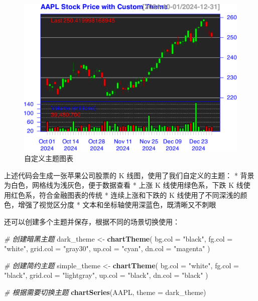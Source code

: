 \documentclass[]{ctexbook}
\newenvironment{Shaded}{\begin{snugshade}}{\end{snugshade}}
\newcommand{\AttributeTok}[1]{\textcolor[rgb]{0.13,0.29,0.53}{#1}}
\newcommand{\CommentTok}[1]{\textcolor[rgb]{0.56,0.35,0.01}{\textit{#1}}}
\newcommand{\FunctionTok}[1]{\textcolor[rgb]{0.13,0.29,0.53}{\textbf{#1}}}
\newcommand{\NormalTok}[1]{#1}
\newcommand{\OtherTok}[1]{\textcolor[rgb]{0.56,0.35,0.01}{#1}}
\newcommand{\StringTok}[1]{\textcolor[rgb]{0.31,0.60,0.02}{#1}}
\begin{document}
\begin{figure}
\includegraphics[width=0.9\linewidth]{QuantmodHandbook_files/figure-latex/customTheme-1} \caption{自定义主题图表}\label{fig:customTheme}
\end{figure}

上述代码会生成一张苹果公司股票的 K 线图，使用了我们自定义的主题：
* 背景为白色，网格线为浅灰色，便于数据查看
* 上涨 K 线使用绿色系，下跌 K 线使用红色系，符合金融图表的传统
* 连续上涨和下跌的 K 线使用了不同深浅的颜色，增强了视觉区分度
* 文本和坐标轴使用深蓝色，既清晰又不刺眼

还可以创建多个主题并保存，根据不同的场景切换使用：

\begin{Shaded}
\begin{Highlighting}[]
\CommentTok{\# 创建暗黑主题}
\NormalTok{dark\_theme }\OtherTok{\textless{}{-}} \FunctionTok{chartTheme}\NormalTok{(}
  \AttributeTok{bg.col =} \StringTok{"black"}\NormalTok{,}
  \AttributeTok{fg.col =} \StringTok{"white"}\NormalTok{,}
  \AttributeTok{grid.col =} \StringTok{"gray30"}\NormalTok{,}
  \AttributeTok{up.col =} \StringTok{"cyan"}\NormalTok{,}
  \AttributeTok{dn.col =} \StringTok{"magenta"}
\NormalTok{)}

\CommentTok{\# 创建简约主题}
\NormalTok{simple\_theme }\OtherTok{\textless{}{-}} \FunctionTok{chartTheme}\NormalTok{(}
  \AttributeTok{bg.col =} \StringTok{"white"}\NormalTok{,}
  \AttributeTok{fg.col =} \StringTok{"black"}\NormalTok{,}
  \AttributeTok{grid.col =} \StringTok{"lightgray"}\NormalTok{,}
  \AttributeTok{up.col =} \StringTok{"black"}\NormalTok{,}
  \AttributeTok{dn.col =} \StringTok{"black"}
\NormalTok{)}

\CommentTok{\# 根据需要切换主题}
\FunctionTok{chartSeries}\NormalTok{(AAPL, }\AttributeTok{theme =}\NormalTok{ dark\_theme)}
\end{Highlighting}
\end{Shaded}
\end{document}
